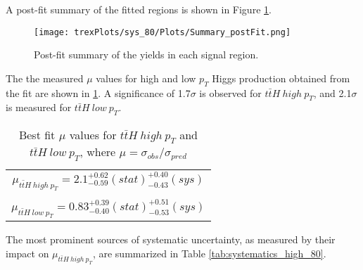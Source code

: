 A post-fit summary of the fitted regions is shown in Figure \ref{fig:Summary80}.

\begin{figure}[H]
    \center
    \texttt{[image: trexPlots/sys\_80/Plots/Summary\_postFit.png]}
    \caption{Post-fit summary of the yields in each signal region.}                                            
    \label{fig:Summary80}
\end{figure}

The the measured $\mu$ values for high and low $p_T$ Higgs production obtained from the fit are shown in \ref{tab:mu80}. A significance of 1.7$\sigma$ is observed for $t\bar{t}H\ high\ p_T$, and 2.1$\sigma$ is measured for $t\bar{t}H\ low\ p_T$.

\begin{table}[H]                                                                                                             
  \centering                                                                                                              
  \begin{tabular}{c}                                                                                            
     $\mu_{t\bar{t}H\ high\ p_T} = 2.1^{+0.62}_{-0.59}(stat)^{+0.40}_{-0.43}(sys)$ \\       
     \\
     $\mu_{t\bar{t}H\ low\ p_T} = 0.83^{+0.39}_{-0.40}(stat)^{+0.51}_{-0.53}(sys)$ \\
  \end{tabular}                                                                                                            
  \caption{Best fit $\mu$ values for $t\bar{t}H\ high\ p_T$ and  $t\bar{t}H\ low\ p_T$, where $\mu = \sigma_{obs}/\sigma_{pred}$}
  \label{tab:mu80}                                                                                                  
\end{table}  

The most prominent sources of systematic uncertainty, as measured by their impact on $\mu_{t\bar{t}H\ high\ p_T}$, are summarized in Table \ref{tab:systematics_high_80}.

